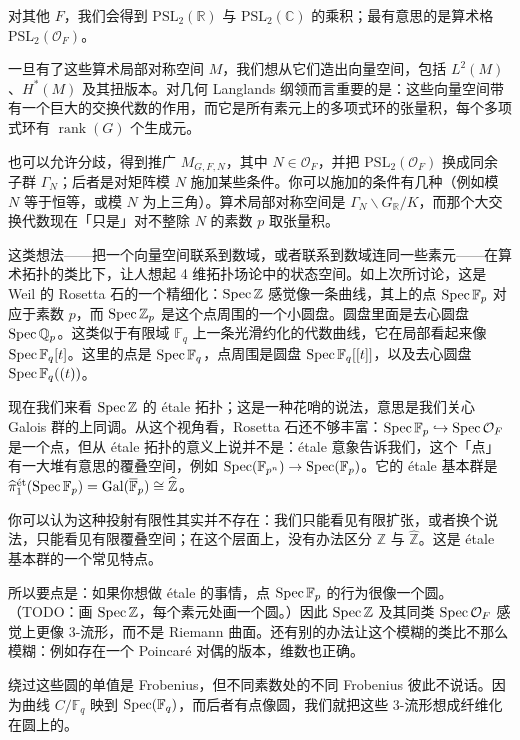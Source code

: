 对其他 $F$，我们会得到 $\mathrm{PSL}_2(\mathbb{R})$ 与 $\mathrm{PSL}_2(\mathbb{C})$ 的乘积；最有意思的是算术格 $\mathrm{PSL}_2(\mathcal{O}_F)$。

一旦有了这些算术局部对称空间 $M$，我们想从它们造出向量空间，包括 $L^2(M)$、$H^*(M)$ 及其扭版本。对几何 Langlands 纲领而言重要的是：这些向量空间带有一个巨大的交换代数的作用，而它是所有素元上的多项式环的张量积，每个多项式环有 $\operatorname{rank}(G)$ 个生成元。

也可以允许分歧，得到推广 $M_{G,F,N}$，其中 $N\in\mathcal{O}_F$，并把 $\mathrm{PSL}_2(\mathcal{O}_F)$ 换成同余子群 $\Gamma_N$；后者是对矩阵模 $N$ 施加某些条件。你可以施加的条件有几种（例如模 $N$ 等于恒等，或模 $N$ 为上三角）。算术局部对称空间是 $\Gamma_N\backslash G_{\mathbb{R}}/K$，而那个大交换代数现在「只是」对不整除 $N$ 的素数 $p$ 取张量积。

这类想法——把一个向量空间联系到数域，或者联系到数域连同一些素元——在算术拓扑的类比下，让人想起 4 维拓扑场论中的状态空间。如上次所讨论，这是 Weil 的 Rosetta 石的一个精细化：$\operatorname{Spec}\mathbb{Z}$ 感觉像一条曲线，其上的点 $\operatorname{Spec}\mathbb{F}_p$ 对应于素数 $p$，而 $\operatorname{Spec}\mathbb{Z}_p$ 是这个点周围的一个小圆盘。圆盘里面是去心圆盘 $\operatorname{Spec}\mathbb{Q}_p$。这类似于有限域 $\mathbb{F}_q$ 上一条光滑约化的代数曲线，它在局部看起来像 $\operatorname{Spec}\mathbb{F}_q[t]$。这里的点是 $\operatorname{Spec}\mathbb{F}_q$，点周围是圆盘 $\operatorname{Spec}\mathbb{F}_q[[t]]$，以及去心圆盘 $\operatorname{Spec}\mathbb{F}_q((t))$。

现在我们来看 $\operatorname{Spec}\mathbb{Z}$ 的 étale 拓扑；这是一种花哨的说法，意思是我们关心 Galois 群的上同调。从这个视角看，Rosetta 石还不够丰富：$\operatorname{Spec}\mathbb{F}_p\hookrightarrow\operatorname{Spec}\mathcal{O}_F$ 是一个点，但从 étale 拓扑的意义上说并不是：étale 意象告诉我们，这个「点」有一大堆有意思的覆叠空间，例如 $\operatorname{Spec}(\mathbb{F}_{p^n})\to\operatorname{Spec}(\mathbb{F}_p)$。它的 étale 基本群是 $\widehat{\pi}_1^{\text{ét}}(\operatorname{Spec}\mathbb{F}_p)=\operatorname{Gal}(\overline{\mathbb{F}}_p)\cong\widehat{\mathbb{Z}}$。

你可以认为这种投射有限性其实并不存在：我们只能看见有限扩张，或者换个说法，只能看见有限覆叠空间；在这个层面上，没有办法区分 $\mathbb{Z}$ 与 $\widehat{\mathbb{Z}}$。这是 étale 基本群的一个常见特点。

所以要点是：如果你想做 étale 的事情，点 $\operatorname{Spec}\mathbb{F}_p$ 的行为很像一个圆。（TODO：画 $\operatorname{Spec}\mathbb{Z}$，每个素元处画一个圆。）因此 $\operatorname{Spec}\mathbb{Z}$ 及其同类 $\operatorname{Spec}\mathcal{O}_F$ 感觉上更像 3-流形，而不是 Riemann 曲面。还有别的办法让这个模糊的类比不那么模糊：例如存在一个 Poincaré 对偶的版本，维数也正确。

绕过这些圆的单值是 Frobenius，但不同素数处的不同 Frobenius 彼此不说话。因为曲线 $C/\mathbb{F}_q$ 映到 $\operatorname{Spec}(\mathbb{F}_q)$，而后者有点像圆，我们就把这些 3-流形想成纤维化在圆上的。

